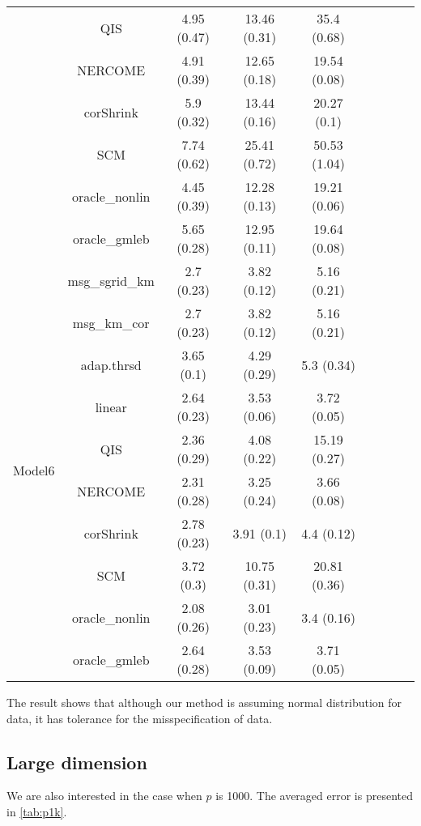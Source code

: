 \documentclass[useAMS,referee,usenatbib]{biom}
\begin{document}
\begin{table}[H]
{\begin{tabular}{ccccccccc}
 & QIS            & 4.95 (0.47) & 13.46 (0.31) & 35.4 (0.68)  \\
 & NERCOME        & 4.91 (0.39) & 12.65 (0.18) & 19.54 (0.08) \\
 & corShrink      & 5.9 (0.32)  & 13.44 (0.16) & 20.27 (0.1)  \\
 & SCM            & 7.74 (0.62) & 25.41 (0.72) & 50.53 (1.04) \\
 & oracle\_nonlin & 4.45 (0.39) & 12.28 (0.13) & 19.21 (0.06) \\
 & oracle\_gmleb  & 5.65 (0.28) & 12.95 (0.11) & 19.64 (0.08) \\  \midrule
\multirow{10}{*}{Model6}  
 & msg\_sgrid\_km & 2.7 (0.23)  & 3.82 (0.12)  & 5.16 (0.21)  \\
 & msg\_km\_cor   & 2.7 (0.23)  & 3.82 (0.12)  & 5.16 (0.21)  \\
 & adap.thrsd     & 3.65 (0.1)  & 4.29 (0.29)  & 5.3 (0.34)   \\
 & linear         & 2.64 (0.23) & 3.53 (0.06)  & 3.72 (0.05)  \\
 & QIS            & 2.36 (0.29) & 4.08 (0.22)  & 15.19 (0.27) \\
 & NERCOME        & 2.31 (0.28) & 3.25 (0.24)  & 3.66 (0.08)  \\
 & corShrink      & 2.78 (0.23) & 3.91 (0.1)   & 4.4 (0.12)   \\
 & SCM            & 3.72 (0.3)  & 10.75 (0.31) & 20.81 (0.36) \\
 & oracle\_nonlin & 2.08 (0.26) & 3.01 (0.23)  & 3.4 (0.16)   \\
 & oracle\_gmleb  & 2.64 (0.28) & 3.53 (0.09)  & 3.71 (0.05)  \\ \bottomrule
\end{tabular}%
}
\end{table}
The result shows that although our method is assuming normal distribution for data, it has tolerance for the misspecification of data. 

\subsection{Large dimension}
We are also interested in the case when $p$ is 1000. The averaged error is presented in \ref{tab:p1k}. 
\end{document}
